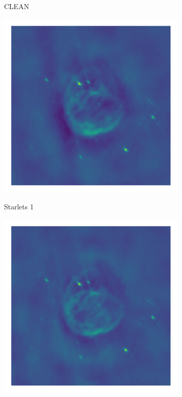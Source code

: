 \begin{figure}[h]
	\centering
	\begin{subfigure}[b]{0.3\linewidth}
		\begin{center}CLEAN\end{center}
		\includegraphics[width=\linewidth, trim={18px 19px 18px 18px}, clip]{./chapters/05.results/g55/clean_image.png}
	\end{subfigure}
	\begin{subfigure}[b]{0.3\linewidth}
		\begin{center}Starlets 1\end{center}
		\includegraphics[width=\linewidth, trim={18px 19px 18px 18px}, clip]{./chapters/05.results/g55/starlets1_image.png}

\end{subfigure}
\end{figure}
